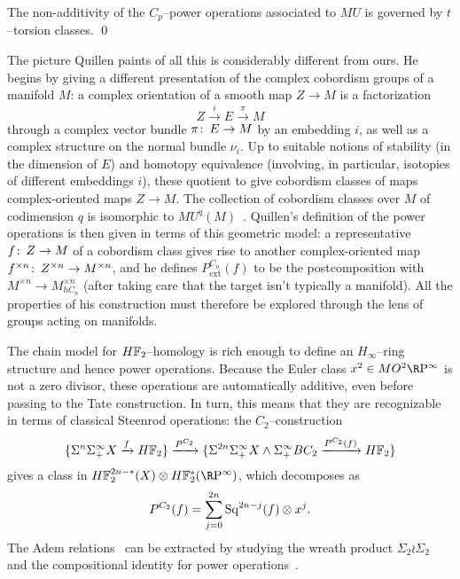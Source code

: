 \begin{corollary}
The non-additivity of the \(C_p\)--power operations associated to \(MU\) is governed by \(t\)--torsion classes. \qed
\end{corollary}

\begin{remark}
The picture Quillen paints of all this is considerably different from ours.  He begins by giving a different presentation of the complex cobordism groups of a manifold \(M\): a complex orientation of a smooth map \(Z \to M\) is a factorization \[Z \xrightarrow{i} E \xrightarrow{\pi} M\] through a complex vector bundle \(\pi\colon\thinspace E \to M\) by an embedding \(i\), as well as a complex structure on the normal bundle \(\nu_i\).  Up to suitable notions of stability (in the dimension of \(E\)) and homotopy equivalence (involving, in particular, isotopies of different embeddings \(i\)), these quotient to give cobordism classes of maps complex-oriented maps \(Z \to M\).  The collection of cobordism classes over \(M\) of codimension \(q\) is isomorphic to \(MU^q(M)\)~\cite[Proposition 1.2]{Quillen}.  Quillen's definition of the power operations is then given in terms of this geometric model: a representative \(f\colon\thinspace Z \to M\) of a cobordism class gives rise to another complex-oriented map \(f^{\times n}\colon\thinspace Z^{\times n} \to M^{\times n}\), and he defines \(P^{C_n}_{\mathrm{ext}}(f)\) to be the postcomposition with \(M^{\times n} \to M^{\times n}_{hC_n}\) (after taking care that the target isn't typically a manifold).  All the properties of his construction must therefore be explored through the lens of groups acting on manifolds.
\end{remark}

\begin{example}
The chain model for \(\HFtwo\)--homology is rich enough to define an $H_\infty$--ring structure and hence power operations.  Because the Euler class $x^2 \in MO^2 \RP^\infty$ is not a zero divisor, these operations are automatically additive, even before passing to the Tate construction.  In turn, this means that they are recognizable in terms of classical Steenrod operations: the \(C_2\)--construction \[\{\Susp^n \Susp^\infty_+ X \xrightarrow{f} \HFtwo\} \xrightarrow{P^{C_2}} \{\Susp^{2n} \Susp^\infty_+ X \sm \Susp^\infty_+ BC_2 \xrightarrow{P^{C_2}(f)} \HFtwo\}\] gives a class in \(\HFtwo^{2n-*}(X) \otimes \HFtwo^*(\RP^\infty)\), which decomposes as \[P^{C_2}(f) = \sum_{j=0}^{2n} \operatorname{Sq}^{2n-j}(f) \otimes x^j.\]  The Adem relations~\cite{Adem} can be extracted by studying the wreath product \(\Sigma_2 \wr \Sigma_2\) and the compositional identity for power operations~\cite{BullettMacdonald}.
\end{example}

